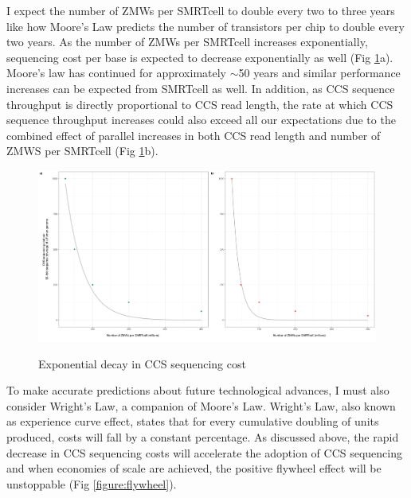 I expect the number of ZMWs per SMRTcell to double every two to three years like how Moore’s Law predicts the number of transistors per chip to double every two years. As the number of ZMWs per SMRTcell increases exponentially, sequencing cost per base is expected to decrease exponentially as well (Fig \ref{figure:ccs_sequence_throughput}a). Moore’s law has continued for approximately $\sim$50 years and similar performance increases can be expected from SMRTcell as well. In addition, as CCS sequence throughput is directly proportional to CCS read length, the rate at which CCS sequence throughput increases could also exceed all our expectations due to the combined effect of parallel increases in both CCS read length and number of ZMWS per SMRTcell (Fig \ref{figure:ccs_sequence_throughput}b). 

\begin{figure}[h]
\caption{Exponential decay in CCS sequencing cost}
\label{figure:ccs_sequence_throughput}
\centering
\includegraphics[width=1\textwidth]{chapter4_fig1.jpg} \\ \smallskip
{}
\end{figure}

To make accurate predictions about future technological advances, I must also consider Wright’s Law, a companion of Moore’s Law. Wright’s Law, also known as experience curve effect, states that for every cumulative doubling of units produced, costs will fall by a constant percentage. As discussed above, the rapid decrease in CCS sequencing costs will accelerate the adoption of CCS sequencing and when economies of scale are achieved, the positive flywheel effect will be unstoppable (Fig \ref{figure:flywheel}). 

